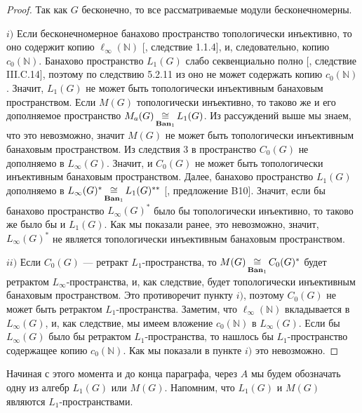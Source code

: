 \begin{proof}
Так как $G$ бесконечно, то все рассматриваемые модули бесконечномерны.

$i)$ Если бесконечномерное банахово пространство топологически инъективно,  то оно содержит копию $\ell_\infty(\mathbb{N})$ [\cite{RosOnRelDisjFamOfMeas}, следствие 1.1.4], и, следовательно, копию $c_0(\mathbb{N})$. Банахово пространство $L_1(G)$ слабо секвенциально полно [\cite{WojBanSpForAnalysts}, следствие III.C.14], поэтому по следствию 5.2.11 из \cite{KalAlbTopicsBanSpTh} оно не может содержать копию $c_0(\mathbb{N})$. Значит, $L_1(G)$ не может быть топологически инъективным банаховым пространством. Если $M(G)$ топологически инъективно, то таково же и его дополняемое пространство $M_a(G)\mathop{\mathbin{\cong}}\limits_{\mathbf{Ban}_1}L_1(G)$. Из рассуждений выше мы знаем, что это невозможно, значит $M(G)$ не может быть топологически инъективным банаховым пространством. Из следствия 3 в \cite{LauMingComplSubspInLInfOfG} пространство $C_0(G)$ не дополняемо в $L_\infty(G)$. Значит, и $C_0(G)$ не может быть топологически инъективным банаховым пространством. Далее, банахово пространство $L_1(G)$ дополняемо в $L_\infty(G)^*\mathop{\mathbin{\cong}}\limits_{\mathbf{Ban}_1}L_1(G)^{**}$ [\cite{DefFloTensNorOpId}, предложение B10]. Значит, если бы банахово пространство $L_\infty(G)^*$ было бы топологически инъективно, то таково же было бы и $L_1(G)$. Как мы показали ранее, это невозможно, значит, $L_\infty(G)^*$ не является топологически инъективным банаховым пространством. 

$ii)$ Если $C_0(G)$ --- ретракт $L_1$-пространства, то $M(G)\mathop{\mathbin{\cong}}\limits_{\mathbf{Ban}_1}C_0(G)^*$ будет ретрактом $L_\infty$-пространства, и, как следствие, будет топологически инъективным банаховым пространством. Это противоречит пункту $i)$, поэтому $C_0(G)$ не может быть ретрактом $L_1$-пространства. Заметим, что $\ell_\infty(\mathbb{N})$ вкладывается в $L_\infty(G)$, и, как следствие, мы имеем вложение $c_0(\mathbb{N})$ в $L_\infty(G)$. Если бы $L_\infty(G)$ было бы ретрактом $L_1$-пространства, то нашлось бы $L_1$-пространство содержащее копию $c_0(\mathbb{N})$. Как мы показали в пункте $i)$ это невозможно.
\end{proof}

Начиная с этого момента и до конца параграфа, через $A$ мы будем обозначать одну из алгебр $L_1(G)$ или $M(G)$. Напомним, что $L_1(G)$ и $M(G)$ являются  $L_1$-пространствами.

